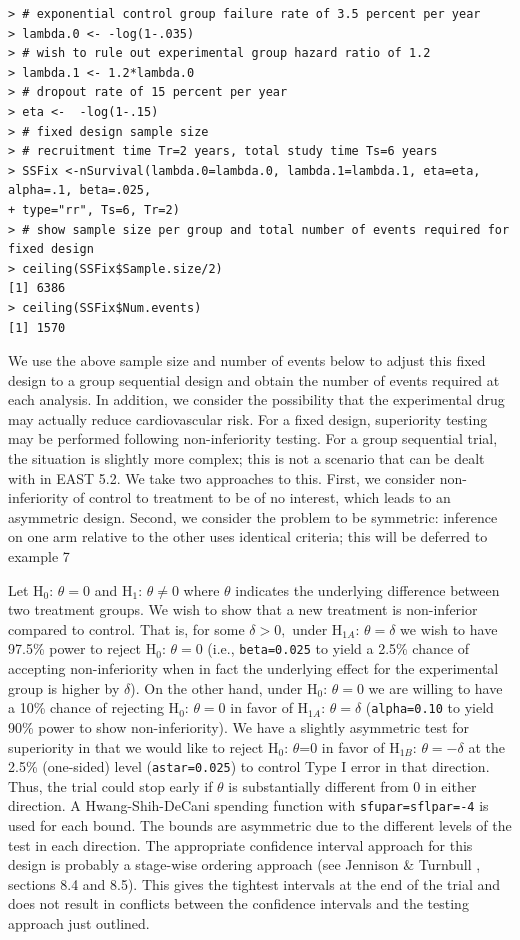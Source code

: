 \bigskip
\begin{verbatim}
> # exponential control group failure rate of 3.5 percent per year
> lambda.0 <- -log(1-.035)
> # wish to rule out experimental group hazard ratio of 1.2 
> lambda.1 <- 1.2*lambda.0
> # dropout rate of 15 percent per year
> eta <-  -log(1-.15)
> # fixed design sample size
> # recruitment time Tr=2 years, total study time Ts=6 years
> SSFix <-nSurvival(lambda.0=lambda.0, lambda.1=lambda.1, eta=eta, alpha=.1, beta=.025,
+ type="rr", Ts=6, Tr=2)
> # show sample size per group and total number of events required for fixed design
> ceiling(SSFix$Sample.size/2)
[1] 6386
> ceiling(SSFix$Num.events)
[1] 1570
\end{verbatim}
\bigskip

We use the above sample size and number of events below to adjust this
fixed design to a group sequential design and obtain the number of events
required at each analysis. In addition, we consider the possibility that the
experimental drug may actually reduce cardiovascular risk. For a fixed design,
superiority testing may be performed following non-inferiority testing. For a
group sequential trial, the situation is slightly more complex; this is not a
scenario that can be dealt with in EAST 5.2. We take two approaches to this.
First, we consider non-inferiority of control to treatment to be of no
interest, which leads to an asymmetric design. Second, we consider the problem
to be symmetric: inference on one arm relative to the other uses identical
criteria; this will be deferred to example 7

Let H$_{0}$: $\theta = 0$ and H$_{1}$: $\theta\neq0$ where $\theta$ indicates
the underlying difference between two treatment groups. We wish to show that a
new treatment is non-inferior compared to control. That is, for some
$\delta > 0,$ under H$_{1A}$: $\theta = \delta$ we wish to have 97.5\% power to
reject H$_{0}$: $\theta = 0$ (i.e., \texttt{beta=0.025} to yield a 2.5\% chance
of accepting non-inferiority when in fact the underlying effect for the
experimental group is higher by $\delta$). On the other hand, under H$_{0}$:
$\theta=0$ we are willing to have a 10\% chance of rejecting H$_{0} $:
$\theta=0$ in favor of H$_{1A}$: $\theta=\delta$ (\texttt{alpha=0.10} to yield
90\% power to show non-inferiority). We have a slightly asymmetric test for
superiority in that we would like to reject H$_{0}$: $\theta$=0 in favor of
H$_{1B}$: $\theta=-\delta$ at the 2.5\% (one-sided) level 
(\texttt{astar=0.025}) to control Type I error in that direction. Thus, 
the trial could stop early if $\theta$ is substantially different from $0$ 
in either direction. A Hwang-Shih-DeCani spending function with 
\texttt{sfupar=sflpar=-4} is used for
each bound. The bounds are asymmetric due to the different levels of the test
in each direction. The appropriate confidence interval approach for this
design is probably a stage-wise ordering approach (see Jennison \& Turnbull
\cite{JTBook}, sections 8.4 and 8.5). This gives the tightest intervals at
the end of the trial and does not result in conflicts between the confidence
intervals and the testing approach just outlined.

